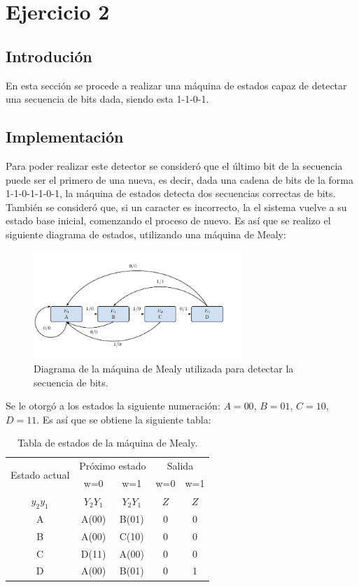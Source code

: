 \section{Ejercicio 2}

\subsection{Introdución}
En esta sección se procede a realizar una máquina de estados capaz de detectar una secuencia de bits dada, siendo esta 1-1-0-1.

\subsection{Implementación} 
Para poder realizar este detector se consideró que el último bit de la secuencia puede ser el primero de una nueva, es decir, dada una cadena de bits de la forma 1-1-0-1-1-0-1, la máquina de estados detecta dos secuencias correctas de bits. También se consideró que, si un caracter es incorrecto, la el sistema vuelve a su estado base inicial, comenzando el proceso de nuevo. Es así que se realizo el siguiente diagrama de estados, utilizando una máquina de Mealy:
\begin{figure}[H]
\centering
	\includegraphics[width=0.7\textwidth, page = 1]{ImagenesEjercicio2/FSM2.pdf}
	\caption{Diagrama de la máquina de Mealy utilizada para detectar la secuencia de bits.}
\end{figure}

Se le otorgó a los estados la siguiente numeración: $A=00$, $B=01$, $C=10$, $D=11$. Es así que se obtiene la siguiente tabla:
\begin{table}[H]
\centering
\begin{tabular}{ccccc}
\hline
\multirow{2}{*}{Estado actual} & \multicolumn{2}{c}{Próximo estado} & \multicolumn{2}{c}{Salida} \\
 & w=0 & w=1 & w=0 & w=1 \\
\hline
$y_2y_1$ & $Y_2Y_1$ & $Y_2Y_1$ & $Z$ & $Z$ \\
A & A(00) & B(01) & 0 & 0 \\
B & A(00) & C(10) & 0 & 0 \\
C & D(11) & A(00) & 0 & 0 \\
D & A(00) & B(01) & 0 & 1 \\
\hline
\end{tabular}
\caption{Tabla de estados de la máquina de Mealy.}
\label{tab:estadosmealy}
\end{table}

